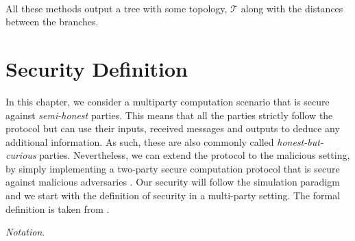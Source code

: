 \

All these methods output a tree with some topology, $\mathcal{T}$ along with the distances between the branches. 







\section{Security Definition} \label{secDefition}

In this chapter, we consider a multiparty computation scenario that is secure against \textit{semi-honest} parties. This means that all the parties strictly follow the protocol but can use their inputs, received messages and outputs to deduce any additional information. As such, these are also commonly called \textit{honest-but-curious} parties. Nevertheless, we can extend the protocol to the malicious setting, by simply implementing a two-party secure computation protocol that is secure against malicious adversaries \cite{Evans2018}. Our security will follow the simulation paradigm and we start with the definition of security in a multi-party setting. The formal definition is taken from \cite{Evans2018}.

\textit{Notation}. 

